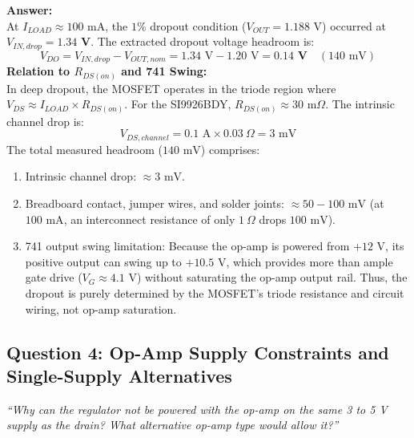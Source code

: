 \documentclass[11pt,a4paper]{article}
\begin{document}
\textbf{Answer:}\\
At $I_{LOAD} \approx 100\text{ mA}$, the $1\%$ dropout condition ($V_{OUT} = 1.188\text{ V}$) occurred at $V_{IN,drop} = \mathbf{1.34\text{ V}}$. The extracted dropout voltage headroom is:
\begin{equation}
    V_{DO} = V_{IN,drop} - V_{OUT,nom} = 1.34\text{ V} - 1.20\text{ V} = \mathbf{0.14\text{ V}} \quad (140\text{ mV})
\end{equation}
\textbf{Relation to $R_{DS(on)}$ and 741 Swing:}\\
In deep dropout, the MOSFET operates in the triode region where $V_{DS} \approx I_{LOAD} \times R_{DS(on)}$. For the SI9926BDY, $R_{DS(on)} \approx 30\text{ m}\Omega$. The intrinsic channel drop is:
\begin{equation}
    V_{DS,channel} = 0.1\text{ A} \times 0.03\ \Omega = 3\text{ mV}
\end{equation}
The total measured headroom ($140\text{ mV}$) comprises:
\begin{enumerate}
    \item Intrinsic channel drop: $\approx 3\text{ mV}$.
    \item Breadboard contact, jumper wires, and solder joints: $\approx 50 - 100\text{ mV}$ (at $100\text{ mA}$, an interconnect resistance of only $1\ \Omega$ drops $100\text{ mV}$).
    \item 741 output swing limitation: Because the op-amp is powered from $+12\text{ V}$, its positive output can swing up to $+10.5\text{ V}$, which provides more than ample gate drive ($V_G \approx 4.1\text{ V}$) without saturating the op-amp output rail. Thus, the dropout is purely determined by the MOSFET's triode resistance and circuit wiring, not op-amp saturation.
\end{enumerate}

\subsection{Question 4: Op-Amp Supply Constraints and Single-Supply Alternatives}
\textit{``Why can the regulator not be powered with the op-amp on the same 3 to 5 V supply as the drain? What alternative op-amp type would allow it?''}
\end{document}
